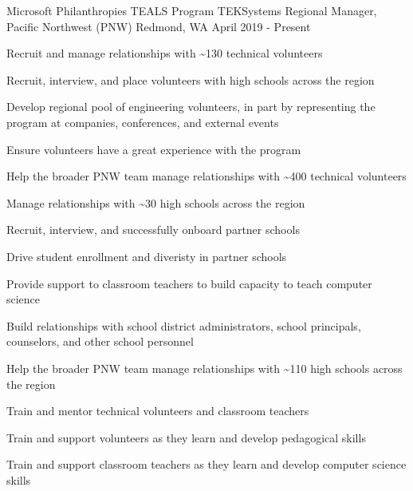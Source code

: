 \begin{cventries}

  \cventry
{Microsoft Philanthropies TEALS Program \newline TEKSystems}
    {Regional Manager, Pacific Northwest (PNW)}
    {Redmond, WA}
    {April 2019 - Present}
    {
      \begin{cvitems}
	\item Recruit and manage relationships with \~{}130 technical volunteers\\
	\begin{cvitems}
		\item Recruit, interview, and place volunteers with high schools across the region
		\item Develop regional pool of engineering volunteers, in part by representing the program at companies, conferences, and external events
		\item Ensure volunteers have a great experience with the program
		\item Help the broader PNW team manage relationships with \~{}400 technical volunteers
	\end{cvitems}
	\vspace{2mm}
	\item Manage relationships with \~{}30 high schools across the region\\
		\begin{cvitems}
		\item Recruit, interview, and successfully onboard partner schools
		\item Drive student enrollment and diveristy in partner schools
		\item Provide support to classroom teachers to build capacity to teach computer science
		\item Build relationships with school district administrators, school principals, counselors, and other school personnel
		\item Help the broader PNW team manage relationships with \~{}110 high schools across the region
	\end{cvitems}
	\vspace{2mm}
	\item Train and mentor technical volunteers and classroom teachers\\
		\begin{cvitems}
		\item Train and support volunteers as they learn and develop pedagogical skills
		\item Train and support classroom teachers as they learn and develop computer science skills

\end{cvitems}
\end{cvitems}}
\end{cventries}
